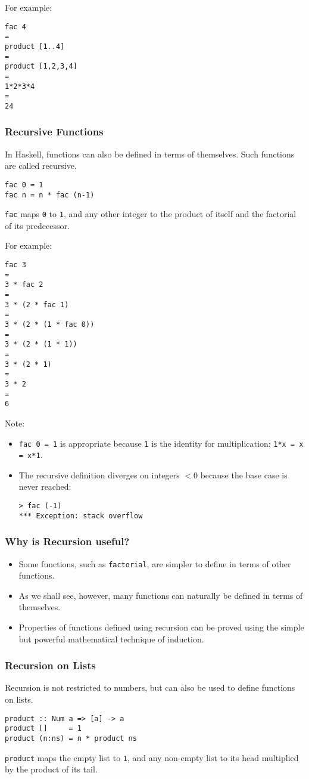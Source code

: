 \begin{multicols}{2}
For example:
\begin{lstlisting}
fac 4
=
product [1..4]
=
product [1,2,3,4]
=
1*2*3*4
=
24
\end{lstlisting}

\subsubsection{Recursive Functions}
In Haskell, functions can also be defined in terms of themselves.
Such functions are called recursive.
\begin{lstlisting}
fac 0 = 1
fac n = n * fac (n-1)
\end{lstlisting}
\lstinline{fac} maps \lstinline{0} to \lstinline{1}, and any other integer to the product of itself and the factorial of its predecessor.

For example:
\begin{lstlisting}
fac 3
=
3 * fac 2
=
3 * (2 * fac 1)
=
3 * (2 * (1 * fac 0))
=
3 * (2 * (1 * 1))
=
3 * (2 * 1)
=
3 * 2
=
6
\end{lstlisting}

Note:
\begin{itemize}
  \item \lstinline{fac 0 = 1} is appropriate because \lstinline{1} is the identity for multiplication: \lstinline{1*x = x = x*1}.
  \item The recursive definition diverges on integers $< 0$ because the base case is never reached:
\begin{lstlisting}
> fac (-1)
*** Exception: stack overflow
\end{lstlisting}
\end{itemize}

\subsubsection{Why is Recursion useful?}
\begin{itemize}
  \item Some functions, such as \lstinline{factorial}, are simpler to define in terms of other functions.
  \item As we shall see, however, many functions can naturally be defined in terms of themselves.
  \item Properties of functions defined using recursion can be proved using the simple but powerful mathematical technique of induction.
\end{itemize}

\subsubsection{Recursion on Lists}
Recursion is not restricted to numbers, but can also be used to define functions on lists.
\begin{lstlisting}
product :: Num a => [a] -> a
product []     = 1
product (n:ns) = n * product ns
\end{lstlisting}
\lstinline{product} maps the empty list to \lstinline{1}, and any non-empty list to its head multiplied by the product of its tail.


\end{multicols}
